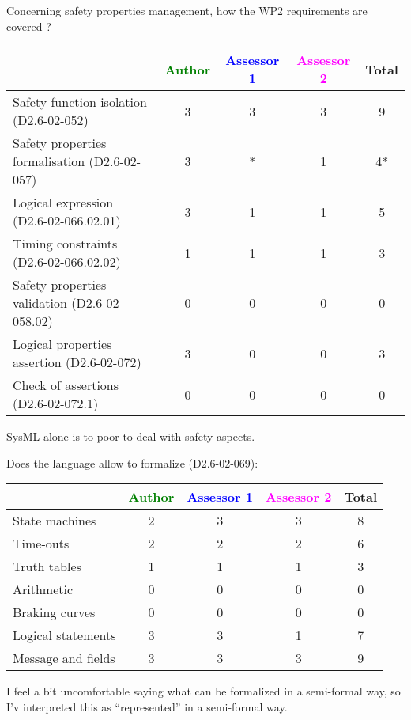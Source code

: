 Concerning safety properties management, how the WP2 requirements are covered ?

\begin{tabular}{|l | c | c | c | c|}
\hline
& \textcolor{green}{Author} & \textcolor{blue}{Assessor 1} & \textcolor{magenta}{Assessor 2} & Total \\
\hline
Safety function isolation (D2.6-02-052) & 3 & 3 & 3 & 9 \\
\hline
Safety properties formalisation (D2.6-02-057) & 3 & * & 1 & 4* \\
\hline
Logical expression (D2.6-02-066.02.01) & 3 & 1 & 1 & 5 \\
\hline
Timing constraints (D2.6-02-066.02.02) & 1 & 1 & 1 & 3 \\
\hline
Safety properties validation (D2.6-02-058.02) & 0 & 0 & 0 & 0 \\
\hline
Logical properties assertion (D2.6-02-072) & 3 & 0 & 0 & 3 \\
\hline
Check of assertions (D2.6-02-072.1) & 0 & 0 &  0 & 0 \\
\hline
\end{tabular}




\begin{assessor2}
SysML alone is to  poor to deal with safety aspects.
\end{assessor2}


Does the language allow to formalize (D2.6-02-069):

\begin{tabular}{|l | c | c | c | c|}
\hline
& \textcolor{green}{Author} & \textcolor{blue}{Assessor 1} & \textcolor{magenta}{Assessor 2} & Total \\
\hline
State machines & 2 & 3 & 3 & 8 \\
\hline
Time-outs & 2 & 2 & 2 & 6 \\
\hline
Truth tables & 1 & 1 & 1 & 3 \\
\hline
Arithmetic & 0 & 0 & 0 & 0 \\
\hline
Braking curves & 0 & 0 & 0 & 0 \\
\hline
Logical statements & 3 & 3 & 1 & 7 \\
\hline
Message and fields & 3 & 3 & 3 & 9 \\
\hline
\end{tabular}

\begin{assessor1}
I feel a bit uncomfortable saying what can be formalized in a semi-formal way, so I'v interpreted this as "`represented"' in a semi-formal way. 
\end{assessor1}


